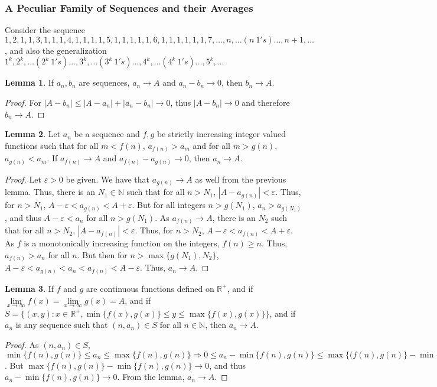 \documentclass[oneside]{book}
\theoremstyle{definition}
\newtheorem{lemma}{Lemma}[section]
\begin{document}
\subsubsection{A Peculiar Family of Sequences and their Averages}

Consider the sequence $1,2,1,1,3,1,1,1,4,1,1,1,1,5,1,1,1,1,1,6,1,1,1,1,1,1,7,\hdots, n,\hdots (n\ 1's)\hdots, n+1,\hdots$, and also the generalization $1^k, 2^k,\hdots (2^k\ 1's)\hdots, 3^k, \hdots (3^k\ 1's)\hdots, 4^k, \hdots (4^k\ 1's)\hdots, 5^k,\hdots$\\

\begin{lemma}
If $a_n, b_n$ are sequences, $a_n\rightarrow A$ and $a_n-b_n\rightarrow 0$, then $b_n \rightarrow A$.
\end{lemma}
\begin{proof}
For $|A-b_n| \leq |A-a_n|+|a_n-b_n| \rightarrow 0$, thus $|A-b_n|\rightarrow 0$ and therefore $b_n \rightarrow A$.
\end{proof}

\begin{lemma}
Let $a_n$ be a sequence and $f,g$ be strictly increasing integer valued functions such that for all $m<f(n)$, $a_{f(n)}>a_m$ and for all $m>g(n)$, $a_{g(n)}<a_m$. If $a_{f(n)}\rightarrow A$ and $a_{f(n)}-a_{g(n)}\rightarrow 0$, then $a_n \rightarrow A$.
\end{lemma}
\begin{proof}
Let $\varepsilon>0$ be given. We have that $a_{g(n)}\rightarrow A$ as well from the previous lemma. Thus, there is an $N_1 \in \mathbb{N}$ such that for all $n>N_1$, $|A-a_{g(n)}|<\varepsilon$. Thus, for $n>N_1$, $A-\varepsilon < a_{g(n)}<A+\varepsilon$. But for all integers $n>g(N_1)$, $a_n >a_{g(N_1)}$, and thus $A-\varepsilon < a_n$ for all $n>g(N_1)$. As $a_{f(n)}\rightarrow A$, there is an $N_2$ such that for all $n>N_2$, $|A-a_{f(n)}|<\varepsilon$. Thus, for $n>N_2$, $A-\varepsilon < a_{f(n)}<A+\varepsilon$. As $f$ is a monotonically increasing function on the integers, $f(n)\geq n$. Thus, $a_{f(n)}>a_n$ for all $n$. But then for $n>\max\{g(N_1),N_2\}$, $A-\varepsilon < a_{g(n)} < a_n < a_{f(n)}<A-\varepsilon$. Thus, $a_n \rightarrow A$.
\end{proof}

\begin{lemma}
If $f$ and $g$ are continuous functions defined on $\mathbb{R}^+$, and if $\underset{x\rightarrow \infty}\lim f(x) = \underset{x\rightarrow \infty}\lim g(x)=A$, and if $S = \{(x,y):x\in \mathbb{R}^+,\min\{f(x),g(x)\}\leq y \leq \max\{f(x),g(x)\}\}$, and if $a_n$ is any sequence such that $(n,a_n)\in S$ for all $n\in \mathbb{N}$, then $a_n \rightarrow A$.
\end{lemma}
\begin{proof}
As $(n,a_n)\in S$, $\min\{f(n),g(n)\} \leq a_n \leq \max\{f(n),g(n)\} \Rightarrow 0 \leq a_n - \min\{f(n),g(n)\} \leq \max\{(f(n),g(n)\}-\min\{f(n),g(n)\}$. But $\max\{f(n),g(n)\}-\min\{f(n),g(n)\} \rightarrow 0$, and thus $a_n - \min\{f(n),g(n)\} \rightarrow 0$. From the lemma, $a_n \rightarrow A$.
\end{proof}
\end{document}
